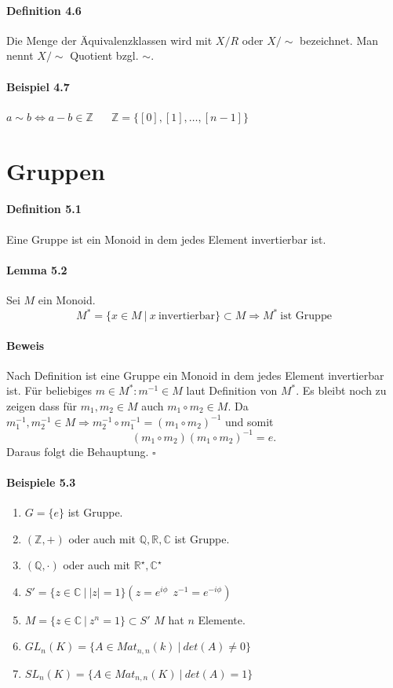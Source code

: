 \documentclass{scrartcl}
\begin{document}
\paragraph{Definition 4.6} Die Menge der Äquivalenzklassen wird mit $X/R$ oder
$X/\sim$ bezeichnet. Man nennt $X/\sim$ Quotient bzgl. $\sim$.

\paragraph{Beispiel 4.7} $a \sim b \Leftrightarrow a - b \in \mathbb{Z}$ ~~
$\mathbb{Z} = \{[0], [1], \dots, [n - 1]\}$

\section{Gruppen}
\label{sec:gruppen}

\paragraph{Definition 5.1} Eine Gruppe ist ein Monoid in dem jedes Element
invertierbar ist.

\paragraph{Lemma 5.2} Sei $M$ ein Monoid.
\[
  M^* = \{ x \in M ~|~ x ~\text{invertierbar} \} \subset M \Rightarrow M^*
  ~\text{ist Gruppe}
\]
\paragraph{Beweis}
Nach Definition ist eine Gruppe ein Monoid in dem jedes Element invertierbar
ist. Für beliebiges $m \in M^*: m^{-1} \in M$ laut Definition von $M^*$. Es
bleibt noch zu zeigen dass für $m_1,m_2\in M$ auch $m_1 \circ m_2 \in M$. Da
$m_1^{-1}, m_2^{-1} \in M \Rightarrow m_2^{-1} \circ m_1^{-1} = (m_1 \circ
m_2)^{-1}$ und somit
\[
  (m_1 \circ m_2)(m_1 \circ m_2)^{-1} = e.
\]
Daraus folgt die Behauptung.
\hfill $\square$
\paragraph{Beispiele 5.3}
\begin{enumerate}
\item $G = \{e\}$ ist Gruppe.
\item $\left( \mathbb{Z}, + \right)$ oder auch mit $\mathbb{Q, R, C}$ ist Gruppe.
\item $\left( \mathbb{Q}, \cdot \right)$ oder auch mit $\mathbb{R^\star,C^\star}$
\item $S' = \{ z \in \mathbb{C} ~|~ |z| = 1\} \left( z = e^{i\phi} ~~ z^{-1} =
    e^{-i\phi} \right)$
\item $M = \{ z \in \mathbb{C} ~|~ z^n = 1\} \subset S'$ $M$ hat $n$ Elemente.
\item $GL_n(K) = \{ A \in Mat_{n,n}(k) ~|~ det(A) \neq 0\}$
  \item $SL_n(K) = \{ A \in Mat_{n,n}(K) ~|~ det(A) = 1\}$
\end{enumerate}
\end{document}
